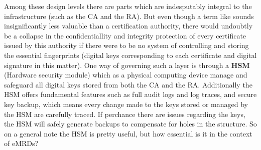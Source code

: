 \documentclass[12pt,
               a4paper,
               article,
               oneside,
               oldfontcommands,
               english]{memoir}
\begin{document}
Among these design levels there are parts which are indesputably integral to the infrastructure (such as the CA and the RA). But even though a term like   sounds insignificantly less valuable than a certification authority, there would undoubtly be a collapse in the confidentiallity and integrity protection of every certificate issued by this authority if there were to be no system of controlling and storing the essential fingerprints (digital keys corresponding to each certificate and digital signature in this matter). One way of governing such a layer is through a \textbf{HSM} (Hardware security module) which as a physical computing device manage and safeguard all digital keys stored from both the CA and the RA. Additionally the HSM offers fundamental features such as full audit logs and log traces, and secure key backup, which means every change made to the keys stored or managed by the HSM are carefully traced. If perchance there are issues regarding the keys, the HSM will safely generate backups to compensate for holes in the structure. So on a general note the HSM is pretty useful, but how essential is it in the context of eMRDs? \vspace{4mm}\\
\end{document}
